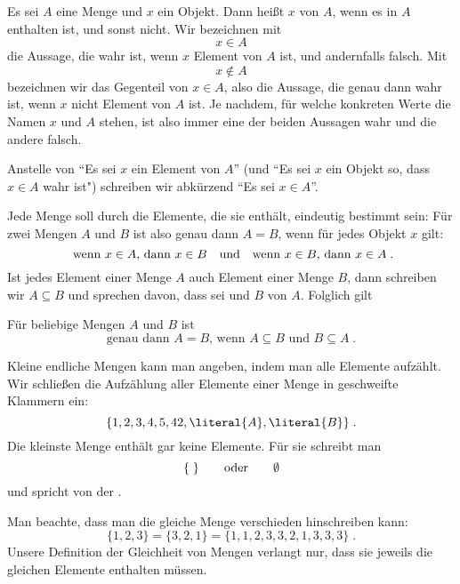 Es sei $A$ eine Menge und $x$ ein Objekt.
%
Dann heißt $x$  von $A$,
wenn es in $A$ enthalten ist, und sonst nicht.
%
Wir bezeichnen mit
\[ x \in A \]
die Aussage, die wahr ist, wenn $x$
Element von $A$
ist, und andernfalls falsch.
%
Mit \[ x \notin A \] bezeichnen wir das Gegenteil von $x \in A$, also die Aussage, die genau dann wahr ist, wenn $x$ nicht Element von $A$ ist.
%
%
Je nachdem, für welche konkreten Werte die Namen $x$
und $A$
stehen, ist also immer eine der beiden Aussagen wahr und die andere
falsch.

Anstelle von “Es sei $x$ ein Element von $A$” (und “Es sei $x$ ein Objekt so, dass $x \in A$ wahr ist") schreiben wir abkürzend “Es sei $x \in A$”.

Jede Menge soll durch die Elemente, die sie enthält, eindeutig
bestimmt sein:
%
Für zwei Mengen $A$ und $B$ ist also genau dann $A=B$, wenn für jedes Objekt $x$
gilt:
\[
  \text{ wenn } x\in A \text{, dann } x\in B \text{\quad und\quad wenn }
  x\in B \text{, dann } x\in A \;.
\]
%
Ist jedes Element einer Menge $A$ auch Element einer Menge $B$, dann
schreiben wir $A\subseteq B$ und sprechen davon, dass  sei und $B$  von $A$.
%
Folglich gilt
\begin{lemma}
  \label{lem:mengen-gleichheit}
  Für beliebige Mengen $A$ und $B$ ist
  \[
    \text{genau dann } A=B \text{, wenn } A\subseteq B \text{ und } B\subseteq A \;.
  \]
\end{lemma}

\noindent
Kleine endliche Mengen kann man angeben, indem man alle Elemente
aufzählt.
%
Wir schließen die Aufzählung aller Elemente einer Menge in
geschweifte Klammern ein:
\[
  \{ 1, 2, 3, 4, 5, 42, \literal{A}, \literal{B} \} \;.
\]
%
Die kleinste Menge enthält gar keine Elemente.
%
Für sie schreibt man
\[
  \{\; \} \text{\qquad oder\qquad} \emptyset
\]
%
und spricht von der .

%
Man beachte, dass man die gleiche Menge verschieden hinschreiben kann:
\[
  \{ 1,2,3 \} = \{ 3,2,1 \} = \{ 1,1,2,3,3,2,1,3,3,3 \} \;.
\]
%
Unsere Definition der Gleichheit von Mengen verlangt nur, dass sie
jeweils die gleichen Elemente enthalten müssen.

